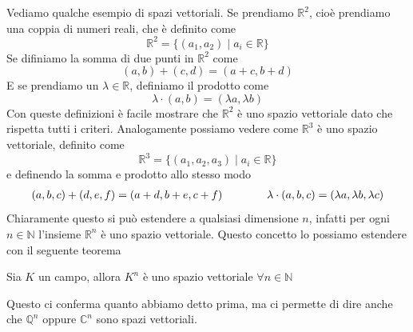 \documentclass{rapport}
\begin{document}
Vediamo qualche esempio di spazi vettoriali. Se prendiamo $\mathbb{R}^2$, cioè prendiamo una coppia di numeri reali, che è definito come 
\[
\mathbb{R}^2 = \{(a_1, a_2) \;|\; a_i \in \mathbb{R}\}
\]
Se difiniamo la somma di due punti in $\mathbb{R}^2$ come
\[
(a,b) + (c,d) = (a+c, b+d)
\] 
E se prendiamo un $\lambda \in \mathbb{R}$, definiamo il prodotto come
\[
\lambda \cdot (a,b) = (\lambda a, \lambda b)
\]
Con queste definizioni è facile mostrare che $\mathbb{R}^2$ è uno spazio vettoriale dato che rispetta tutti i criteri. Analogamente possiamo vedere come $\mathbb{R}^3$ è uno spazio vettoriale, definito come
\[
\mathbb{R}^3 = \{(a_1, a_2,a_3) \;|\; a_i \in \mathbb{R}\}
\]
e definendo la somma e prodotto allo stesso modo
\[
\begin{array}{c@{\qquad}@{\qquad}c}
  (a,b,c) + (d,e,f) = (a+d, b+e, c+f) & \lambda \cdot (a,b,c) = (\lambda a, \lambda b, \lambda c)
\end{array}
\]
Chiaramente questo si può estendere a qualsiasi dimensione $n$, infatti per ogni $n\in\mathbb{N}$ l'insieme $\mathbb{R}^n$ è uno spazio vettoriale. Questo concetto lo possiamo estendere con il seguente teorema
\begin{teorema}{}{}
  Sia $K$ un campo, allora $K^n$ è uno spazio vettoriale $\forall n \in \mathbb{N}$
\end{teorema}

Questo ci conferma quanto abbiamo detto prima, ma ci permette di dire anche che $\mathbb{Q}^n$ oppure $\mathbb{C}^n$ sono spazi vettoriali. 
\end{document}
